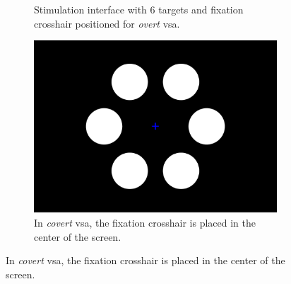 \documentclass[twocolumn]{article}
\begin{document}
\begin{figure}[t]
\begin{minipage}[b]{.54\textwidth}
\begin{subfigure}[b]{.45\linewidth}
			\caption{Stimulation interface with 6 targets and fixation crosshair
				positioned for \emph{overt} \ac{vsa}.}
		\end{subfigure}\hfill%
		\begin{subfigure}[b]{.45\linewidth}
			\includegraphics[width=\textwidth]{figures/stim_covert.pdf}
			\caption{In \emph{covert} \ac{vsa}, the fixation crosshair is placed in the
				center of the screen.}
		\end{subfigure}
		\smallskip


\end{minipage}
\end{figure}
\end{document}
